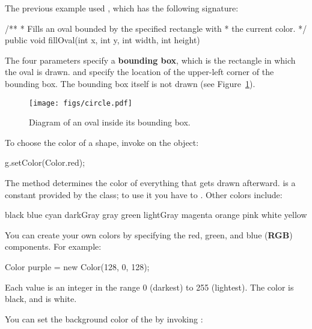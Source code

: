 The previous example used , which has the following signature:

\begin{code}
/**
 * Fills an oval bounded by the specified rectangle with
 * the current color.
 */
public void fillOval(int x, int y, int width, int height)
\end{code}


The four parameters specify a {\bf bounding box}, which is the rectangle in which the oval is drawn.
 and  specify the location of the upper-left corner of the bounding box.
The bounding box itself is not drawn (see Figure~\ref{fig.circle}).

\begin{figure}[!ht]
\begin{center}
\texttt{[image: figs/circle.pdf]}
\caption{Diagram of an oval inside its bounding box.}
\label{fig.circle}
\end{center}
\end{figure}


To choose the color of a shape, invoke  on the  object:

\begin{code}
g.setColor(Color.red);
\end{code}

The  method determines the color of everything that gets drawn afterward.
 is a constant provided by the  class; to use it you have to .
Other colors include:

\begin{stdout}
black       blue      cyan     darkGray   gray    green
lightGray   magenta   orange   pink       white   yellow
\end{stdout}


You can create your own colors by specifying the red, green, and blue ({\bf RGB}) components.
For example:

\begin{code}
Color purple = new Color(128, 0, 128);
\end{code}

Each value is an integer in the range 0 (darkest) to 255 (lightest).
The color  is black, and  is white.

You can set the background color of the  by invoking :

